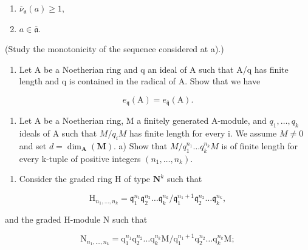 \begin{enumerate}
\def\labelenumi{(\roman{enumi})}
\item
  \(\overline{\nu}_{\mathfrak{a}}(a)\geqslant 1,\)
\item
  \(a \in \overline{\mathfrak{a}}\).
\end{enumerate}

(Study the monotonicity of the sequence considered at a).)

\begin{enumerate}
\def\labelenumi{\arabic{enumi})}
\setcounter{enumi}{18}
\tightlist
\item
  Let A be a Noetherian ring and q an ideal of A such that A/q has finite length and q is contained in the radical of A. Show that we have
\end{enumerate}

\[
e _ {\mathfrak {q}} (\mathrm{A}) = e _ {\overline {{\mathfrak {q}}}} (\mathrm{A}).
\]

\begin{enumerate}
\def\labelenumi{\arabic{enumi})}
\setcounter{enumi}{19}
\tightlist
\item
  Let A be a Noetherian ring, M a finitely generated A-module, and \(q_{1}, \ldots, q_{k}\) ideals of A such that \(M/q_{i}M\) has finite length for every i. We assume \(M \neq 0\) and set \(d = \dim_{\mathbf{A}}(\mathbf{M})\). a) Show that \(M/q_{1}^{n_{1}} \ldots q_{k}^{n_{k}}M\) is of finite length for every k-tuple of positive integers \((n_{1}, \ldots, n_{k})\).
\end{enumerate}

\begin{enumerate}
\def\labelenumi{\alph{enumi})}
\setcounter{enumi}{1}
\tightlist
\item
  Consider the graded ring H of type \(\mathbf{N}^k\) such that
\end{enumerate}

\[
\mathrm{H} _ {n _ {1}, \dots , n _ {k}} = \mathfrak {q} _ {1} ^ {n _ {1}} \mathfrak {q} _ {2} ^ {n _ {2}} \dots \mathfrak {q} _ {k} ^ {n _ {k}} / \mathfrak {q} _ {1} ^ {n _ {1} + 1} \mathfrak {q} _ {2} ^ {n _ {2}} \dots \mathfrak {q} _ {k} ^ {n _ {k}},
\]

and the graded H-module N such that

\[
 \mathrm{N} _ {n _ {1}, \dots , n _ {k}} = \mathrm{q} _ {1} ^ {n _ {1}} \mathrm{q} _ {2} ^ {n _ {2}} \dots \mathrm{q} _ {k} ^ {n _ {k}} \mathrm{M} / \mathrm{q} _ {1} ^ {n _ {1} + 1} \mathrm{q} _ {2} ^ {n _ {2}} \dots \mathrm{q} _ {k} ^ {n _ {k}} \mathrm{M};
\]

